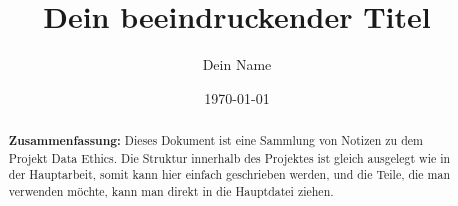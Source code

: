 \documentclass{article}
\title{Dein beeindruckender Titel}
\author{Dein Name}
\date{\today}
\begin{document}
\maketitle

\newpage

\begin{abstract}
    \textbf{Zusammenfassung:} Dieses Dokument ist eine Sammlung von Notizen zu dem Projekt Data Ethics. Die Struktur innerhalb des Projektes ist gleich ausgelegt wie in der Hauptarbeit, somit kann hier einfach geschrieben werden, und die Teile, die man verwenden möchte, kann man direkt in die Hauptdatei ziehen.
\end{abstract}

\newpage

\tableofcontents

\newpage



\newpage

\printbibliography
\end{document}
